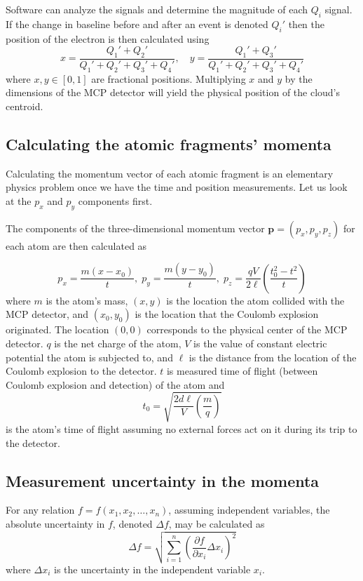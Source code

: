 Software can analyze the signals and determine the magnitude of each $Q_i$ signal. If the change in baseline before and after an event is denoted $Q_i'$ then the position of the electron is then calculated using
\begin{equation}\label{eq:xy}
x = \frac{Q_1' + Q_2'}
         {Q_1' + Q_2' + Q_3' + Q_4'} ,\quad
y = \frac{Q_1' + Q_3'}
         {Q_1' + Q_2' + Q_3' + Q_4'}
\end{equation}
where $x,y \in [0,1]$ are fractional positions. Multiplying $x$ and $y$ by the dimensions of the MCP detector will yield the physical position of the cloud's centroid.

\subsection{Calculating the atomic fragments' momenta}
Calculating the momentum vector of each atomic fragment is an elementary physics problem once we have the time and position measurements. Let us look at the $p_x$ and $p_y$ components first.

The components of the three-dimensional momentum vector $\mathbf{p} = (p_x,p_y,p_z)$ for each atom are then calculated as

\begin{equation}\label{eq:CEImomenta}
p_x = \frac{m(x-x_0)}{t} ,\;
p_y = \frac{m(y-y_0)}{t} ,\;
p_z = \frac{qV}{2\ell} \left( \frac{t_0^2 - t^2}{t} \right)
\end{equation}
where $m$ is the atom's mass, $(x,y)$ is the location the atom collided with the MCP detector, and $(x_0,y_0)$ is the location that the Coulomb explosion originated. The location $(0,0)$ corresponds to the physical center of the MCP detector. $q$ is the net charge of the atom, $V$ is the value of constant electric potential the atom is subjected to, and $\ell$ is the distance from the location of the Coulomb explosion to the detector. $t$ is measured time of flight (between Coulomb explosion and detection) of the atom and 
\begin{equation}
t_0 = \sqrt{\frac{2d\ell}{V} \left( \frac{m}{q} \right)}
\end{equation}
is the atom's time of flight assuming no external forces act on it during its trip to the detector.

\subsection{Measurement uncertainty in the momenta}
For any relation $f = f(x_1, x_2, \dots, x_n)$, assuming independent variables, the absolute uncertainty in $f$, denoted $\Delta f$, may be calculated as
\begin{equation}
\Delta f = \sqrt{\sum_{i=1}^{n} \left( \frac{\partial f}{\partial x_i} \Delta x_i \right)^2}
\end{equation}
where $\Delta x_i$ is the uncertainty in the independent variable $x_i$.

